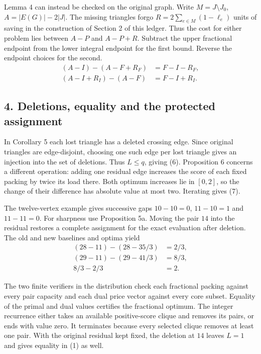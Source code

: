 \documentclass[english,11pt,a4paper]{article}
\begin{document}
Lemma 4 can instead be checked on the original graph. Write \(M=J\setminus J_0\), \(A=|E(G)|-2|J|\). The missing triangles forgo \(R=2\sum_{e\in M}(1-\ell_e)\) units of saving in the construction of Section 2 of this ledger. Thus the cost for either problem lies between \(A-P\) and \(A-P+R\). Subtract the upper fractional endpoint from the lower integral endpoint for the first bound. Reverse the endpoint choices for the second.
\[
\begin{aligned}
(A-I)-(A-F+R_F)&=F-I-R_F,\\
(A-I+R_I)-(A-F)&=F-I+R_I.
\end{aligned}
\]

\subsection{4. Deletions, equality and the protected assignment}\label{deletions-equality-and-the-protected-assignment}

In Corollary 5 each lost triangle has a deleted crossing edge. Since original triangles are edge-disjoint, choosing one such edge per lost triangle gives an injection into the set of deletions. Thus \(L\le q\), giving (6). Proposition 6 concerns a different operation: adding one residual edge increases the score of each fixed packing by twice its load there. Both optimum increases lie in \([0,2]\), so the change of their difference has absolute value at most two. Iterating gives (7).

The twelve-vertex example gives successive gaps \(10-10=0\), \(11-10=1\) and \(11-11=0\). For sharpness use Proposition 5a. Moving the pair \(14\) into the residual restores a complete assignment for the exact evaluation after deletion. The old and new baselines and optima yield
\[
\begin{aligned}
(28-11)-(28-35/3)&=2/3,\\
(29-11)-(29-41/3)&=8/3,\\
8/3-2/3&=2.
\end{aligned}
\]

The two finite verifiers in the distribution check each fractional packing against every pair capacity and each dual price vector against every core subset. Equality of the primal and dual values certifies the fractional optimum. The integer recurrence either takes an available positive-score clique and removes its pairs, or ends with value zero. It terminates because every selected clique removes at least one pair. With the original residual kept fixed, the deletion at \(14\) leaves \(L=1\) and gives equality in (1) as well.
\end{document}
